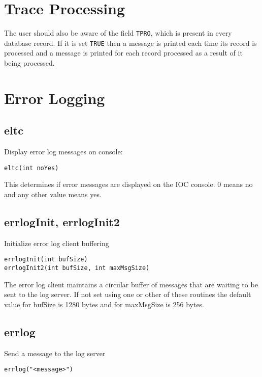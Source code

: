 \section{Trace Processing}

The user should also be aware of the field \verb|TPRO|, which is present in every database record. If it is set \verb|TRUE| then a 
message is printed each time its record is processed and a message is printed for each record processed as a result of it 
being processed.

\section{Error Logging}

\subsection{eltc}

Display error log messages on console:

\begin{verbatim}
eltc(int noYes)
\end{verbatim}

This determines if error messages are displayed on the IOC console. 0 means no and any other value means yes.

\subsection{errlogInit, errlogInit2}

Initialize error log client buffering

\begin{verbatim}
errlogInit(int bufSize)
errlogInit2(int bufSize, int maxMsgSize)
\end{verbatim}

The error log client maintains a circular buffer of messages that are waiting to be sent to the log server.  If not set using 
one or other of these routines the default value for bufSize is 1280 bytes and for maxMsgSize is 256 bytes.

\subsection{errlog}

Send a message to the log server

\begin{verbatim}
errlog("<message>")
\end{verbatim}

